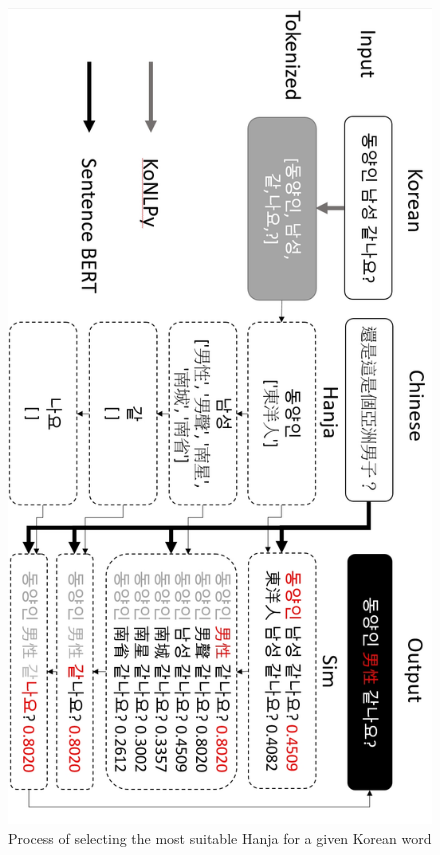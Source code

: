 \documentclass[PhD]{PHlab-thesis}
\begin{document}
\clearpage
\begin{figure}[h!]
  \centering
  \includegraphics[width=0.75\linewidth]{fig_3_7.jpg}
  \captionsetup{type=figure}
  \caption{Process of selecting the most suitable Hanja for a given Korean word}
  \label{fig:example_hanja_process}
\end{figure}


\clearpage
\end{document}

